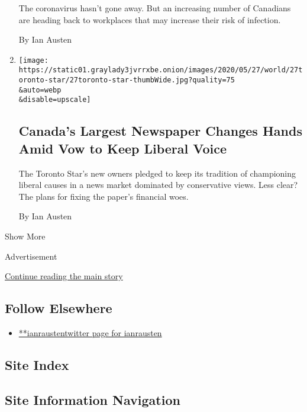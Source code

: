 \begin{enumerate}
  The coronavirus hasn't gone away. But an increasing number of
  Canadians are heading back to workplaces that may increase their risk
  of infection.

  By Ian Austen
\item
  \href{/2020/05/27/world/canada/Toronto-star-sold.html}{}

  \texttt{[image: https://static01.graylady3jvrrxbe.onion/images/2020/05/27/world/27toronto-star/27toronto-star-thumbWide.jpg?quality=75\\\&auto=webp\\\&disable=upscale]}

  \hypertarget{canadas-largest-newspaper-changes-hands-amid-vow-to-keep-liberal-voice}{%
  \subsection{Canada's Largest Newspaper Changes Hands Amid Vow to Keep
  Liberal
  Voice}\label{canadas-largest-newspaper-changes-hands-amid-vow-to-keep-liberal-voice}}

  The Toronto Star's new owners pledged to keep its tradition of
  championing liberal causes in a news market dominated by conservative
  views. Less clear? The plans for fixing the paper's financial woes.

  By Ian Austen
\end{enumerate}

Show More

Advertisement

\protect\hyperlink{after-mid2}{Continue reading the main story}

\hypertarget{follow-elsewhere}{%
\subsection{Follow Elsewhere}\label{follow-elsewhere}}

\begin{itemize}
\tightlist
\item
  \href{https://twitter.com/ianrausten}{**ianraustentwitter page for
  ianrausten}
\end{itemize}

\hypertarget{site-index}{%
\subsection{Site Index}\label{site-index}}

\hypertarget{site-information-navigation}{%
\subsection{Site Information
Navigation}\label{site-information-navigation}}


